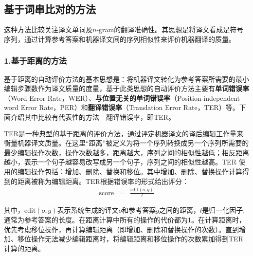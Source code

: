 
\subsection{基于词串比对的方法}

\parinterval 这种方法比较关注译文单词及$n$-gram的翻译准确性。其思想是将译文看成是符号序列，通过计算参考答案和机器译文间的序列相似性来评价机器翻译的质量。


\subsubsection{1.基于距离的方法}

\parinterval 基于距离的自动评价方法的基本思想是：将机器译文转化为参考答案所需要的最小编辑步骤数作为译文质量的度量，基于此类思想的自动评价方法主要有{\small\sffamily\bfseries{单词错误率}}（Word Error Rate，WER）、{\small\sffamily\bfseries{与位置无关的单词错误率}}（Position-independent word Error Rate，PER）和{\small\sffamily\bfseries{翻译错误率}}（Translation Error Rate，TER）等。下面介绍其中比较有代表性的方法\ \dash \ 翻译错误率，即TER。

\parinterval TER是一种典型的基于距离的评价方法，通过评定机器译文的译后编辑工作量来衡量机器译文质量。在这里“距离”被定义为将一个序列转换成另一个序列所需要的最少编辑操作次数，操作次数越多，距离越大，序列之间的相似性越低；相反距离越小，表示一个句子越容易改写成另一个句子，序列之间的相似性越高。TER 使用的编辑操作包括：增加、删除、替换和移位。其中增加、删除、替换操作计算得到的距离被称为编辑距离。TER根据错误率的形式给出评分：
\begin{eqnarray}
\textrm{score}&=& \frac{\textrm{edit}(o,g)}{l}
\label{eq:4-3}
\end{eqnarray}

\noindent 其中，$\textrm{edit}(o,g)$表示系统生成的译文$o$和参考答案$g$之间的距离，$l$是归一化因子,通常为参考答案的长度。在距离计算中所有的操作的代价都为1。在计算距离时，优先考虑移位操作，再计算编辑距离（即增加、删除和替换操作的次数）。直到增加、移位操作无法减少编辑距离时，将编辑距离和移位操作的次数累加得到TER计算的距离。

